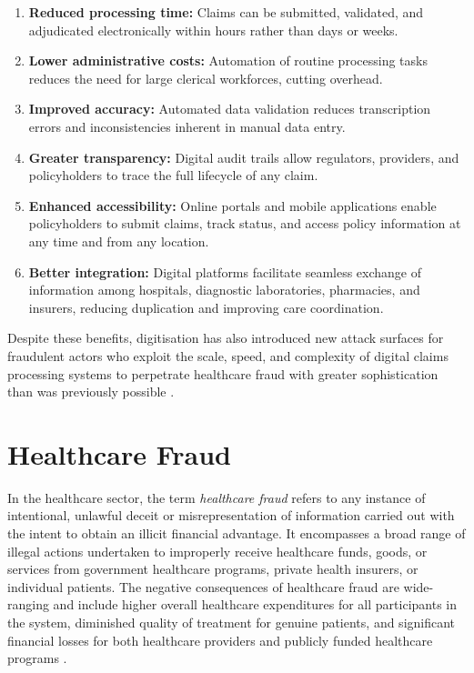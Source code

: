 \begin{enumerate}[label=\roman*.]
    \item \textbf{Reduced processing time:} Claims can be submitted, validated, and adjudicated electronically within hours rather than days or weeks.
    \item \textbf{Lower administrative costs:} Automation of routine processing tasks reduces the need for large clerical workforces, cutting overhead.
    \item \textbf{Improved accuracy:} Automated data validation reduces transcription errors and inconsistencies inherent in manual data entry.
    \item \textbf{Greater transparency:} Digital audit trails allow regulators, providers, and policyholders to trace the full lifecycle of any claim.
    \item \textbf{Enhanced accessibility:} Online portals and mobile applications enable policyholders to submit claims, track status, and access policy information at any time and from any location.
    \item \textbf{Better integration:} Digital platforms facilitate seamless exchange of information among hospitals, diagnostic laboratories, pharmacies, and insurers, reducing duplication and improving care coordination.
\end{enumerate}

Despite these benefits, digitisation has also introduced new attack surfaces for fraudulent actors who exploit the scale, speed, and complexity of digital claims processing systems to perpetrate healthcare fraud with greater sophistication than was previously possible \cite{patil2014}.

\section{Healthcare Fraud}

In the healthcare sector, the term \textit{healthcare fraud} refers to any instance of intentional, unlawful deceit or misrepresentation of information carried out with the intent to obtain an illicit financial advantage. It encompasses a broad range of illegal actions undertaken to improperly receive healthcare funds, goods, or services from government healthcare programs, private health insurers, or individual patients. The negative consequences of healthcare fraud are wide-ranging and include higher overall healthcare expenditures for all participants in the system, diminished quality of treatment for genuine patients, and significant financial losses for both healthcare providers and publicly funded healthcare programs \cite{macfarlane2020}.

